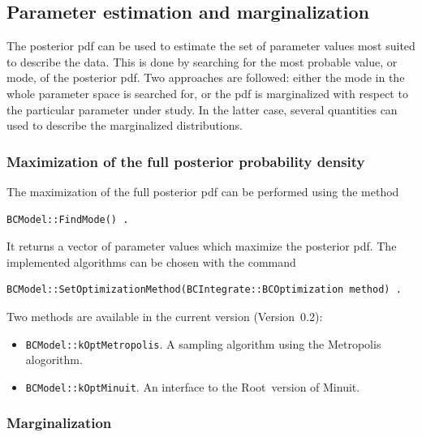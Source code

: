 \documentclass[11pt, a4paper]{article}
\newcommand{\Root}{{\sc Root}}
\newcommand{\versionno}{0.2}
\newcommand{\Version}{Version~\versionno}
\begin{document}

\subsection{Parameter estimation and marginalization} 

The posterior pdf can be used to estimate the set of parameter values
most suited to describe the data. This is done by searching for the
most probable value, or mode, of the posterior pdf. Two approaches are
followed: either the mode in the whole parameter space is searched
for, or the pdf is marginalized with respect to the particular
parameter under study. In the latter case, several quantities can used
to describe the marginalized distributions.


\subsubsection{Maximization of the full posterior probability density} 

The maximization of the full posterior pdf can be performed using the
method
%
\begin{verbatim} 
BCModel::FindMode() . 
\end{verbatim} 

\noindent 
It returns a vector of parameter values which maximize the posterior
pdf. The implemented algorithms can be chosen with the command
%
\begin{verbatim}
BCModel::SetOptimizationMethod(BCIntegrate::BCOptimization method) .
\end{verbatim}
%
Two methods are available in the current version (\Version): 
%
\begin{itemize}
\item \verb|BCModel::kOptMetropolis|. A sampling algorithm using the
  Metropolis alogorithm.
\item \verb|BCModel::kOptMinuit|. An interface to the \Root\ version
  of Minuit.
\end{itemize}


\subsubsection{Marginalization} 
\label{subsubsection:marginalization}
\end{document}
